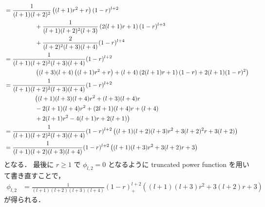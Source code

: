 \begin{align}
     & = \frac{1}{(l+1)(l+2)^2} \left( (l+1)r^2 + r \right) (1-r)^{l+2}
    \notag                                                                                                             \\
     & \hspace{5em}
    + \frac{1}{(l+1)(l+2)^2(l+3)} \left( 2(l+1)r + 1 \right) (1-r)^{l+3}
    \notag                                                                                                             \\
     & \hspace{5em}
    + \frac{2}{(l+2)^2(l+3)(l+4)} (1-r)^{l+4}
    \notag                                                                                                             \\
     & = \frac{1}{(l+1)(l+2)^2(l+3)(l+4)} (1-r)^{l+2}
    \notag                                                                                                             \\
     & \hspace{5em}
    \left( (l+3)(l+4) \left( (l+1)r^2 + r \right) + (l+4) \left( 2(l+1)r + 1 \right) (1-r)
    + 2(l+1) (1-r)^2 \right)
    \notag                                                                                                             \\
     & = \frac{1}{(l+1)(l+2)^2(l+3)(l+4)} (1-r)^{l+2}
    \notag                                                                                                             \\
     & \hspace{5em}
    \big( (l+1)(l+3)(l+4) r^2 + (l+3)(l+4)r
    \notag                                                                                                             \\
     & \hspace{5em}
    - 2(l+1)(l+4)r^2 + (2l+1)(l+4)r + (l+4)
    \notag                                                                                                             \\
     & \hspace{5em}
    + 2(l+1)r^2 - 4(l+1)r +2(l+1) \big)
    \notag                                                                                                             \\
     & = \frac{1}{(l+1)(l+2)^2(l+3)(l+4)} (1-r)^{l+2}
    \left( (l+1)(l+2)(l+3)r^2 + 3(l+2)^2r + 3(l+2) \right)
    \notag                                                                                                             \\
     & = \frac{1}{(l+1)(l+2)(l+3)(l+4)} (1-r)^{l+2}
    \left( (l+1)(l+3)r^2 + 3(l+2)r + 3 \right)
\end{align}
となる．
最後に $r \ge 1$ で $\phi_{l,2} = 0$ となるように truncated power function を用いて書き直すことで，
\begin{align}
    \phi_{l,2} & = \frac{1}{(l+1)(l+2)(l+3)(l+4)} (1 - r)_+^{l+2}
    \left( (l+1)(l+3)r^2 + 3(l+2)r + 3 \right)
\end{align}
が得られる．
